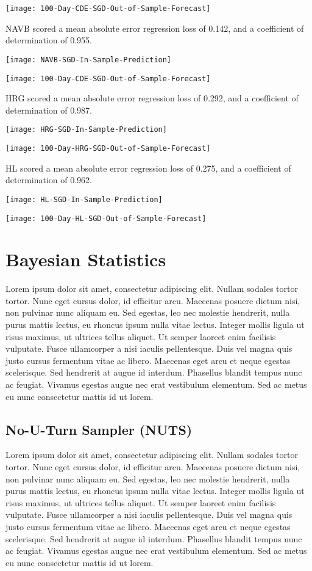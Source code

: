 \texttt{[image: 100-Day-CDE-SGD-Out-of-Sample-Forecast]}

NAVB scored a mean absolute error regression loss of 0.142, and a coefficient of determination of 0.955.

\texttt{[image: NAVB-SGD-In-Sample-Prediction]}

\texttt{[image: 100-Day-CDE-SGD-Out-of-Sample-Forecast]}

HRG scored a mean absolute error regression loss of 0.292, and a coefficient of determination of 0.987.

\texttt{[image: HRG-SGD-In-Sample-Prediction]}

\texttt{[image: 100-Day-HRG-SGD-Out-of-Sample-Forecast]}

HL scored a mean absolute error regression loss of 0.275, and a coefficient of determination of 0.962.

\texttt{[image: HL-SGD-In-Sample-Prediction]}

\texttt{[image: 100-Day-HL-SGD-Out-of-Sample-Forecast]}

\section{Bayesian Statistics}
Lorem ipsum dolor sit amet, consectetur adipiscing elit. Nullam sodales tortor tortor. Nunc eget cursus dolor, id efficitur arcu. Maecenas posuere dictum nisi, non pulvinar nunc aliquam eu. Sed egestas, leo nec molestie hendrerit, nulla purus mattis lectus, eu rhoncus ipsum nulla vitae lectus. Integer mollis ligula ut risus maximus, ut ultrices tellus aliquet. Ut semper laoreet enim facilisis vulputate. Fusce ullamcorper a nisi iaculis pellentesque. Duis vel magna quis justo cursus fermentum vitae ac libero. Maecenas eget arcu et neque egestas scelerisque. Sed hendrerit at augue id interdum. Phasellus blandit tempus nunc ac feugiat. Vivamus egestas augue nec erat vestibulum elementum. Sed ac metus eu nunc consectetur mattis id ut lorem.

\subsection{No-U-Turn Sampler (NUTS)}
Lorem ipsum dolor sit amet, consectetur adipiscing elit. Nullam sodales tortor tortor. Nunc eget cursus dolor, id efficitur arcu. Maecenas posuere dictum nisi, non pulvinar nunc aliquam eu. Sed egestas, leo nec molestie hendrerit, nulla purus mattis lectus, eu rhoncus ipsum nulla vitae lectus. Integer mollis ligula ut risus maximus, ut ultrices tellus aliquet. Ut semper laoreet enim facilisis vulputate. Fusce ullamcorper a nisi iaculis pellentesque. Duis vel magna quis justo cursus fermentum vitae ac libero. Maecenas eget arcu et neque egestas scelerisque. Sed hendrerit at augue id interdum. Phasellus blandit tempus nunc ac feugiat. Vivamus egestas augue nec erat vestibulum elementum. Sed ac metus eu nunc consectetur mattis id ut lorem.

